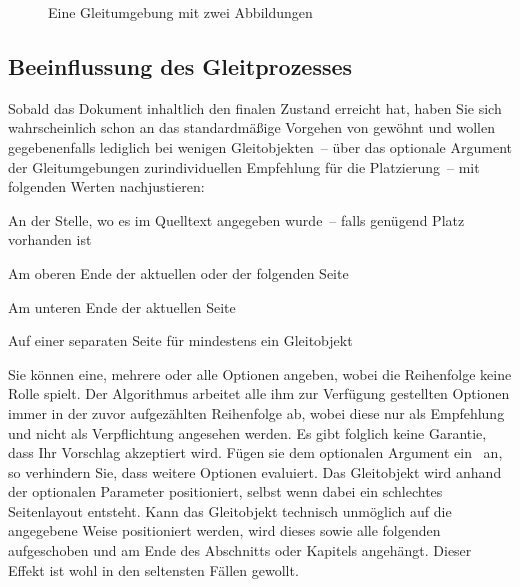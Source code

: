 \documentclass[%
  english,ngerman,%
  cdgeometry=no,DIV=12,%
  automark,%
  listof=toc,%
]{tudscrartcl}
\begin{document}
\begin{Trunk}
\begin{figure}
%
  {\caption{Eine Gleitumgebung mit zwei Abbildungen}\label{fig:logos}}%
\end{figure}

\end{Trunk}
\InputCode


\subsection{Beeinflussung des Gleitprozesses}
Sobald das Dokument inhaltlich den finalen Zustand erreicht hat, haben Sie sich 
wahrscheinlich schon an das standardmäßige Vorgehen von  gewöhnt 
und wollen gegebenenfalls lediglich bei wenigen Gleitobjekten~-- über das 
optionale Argument der Gleitumgebungen zurindividuellen Empfehlung für die 
Platzierung~-- mit folgenden Werten nachjustieren:
%
\begin{description}[labelindent=\parindent,leftmargin=*,style=nextline,itemsep=0pt]
\item[\POParameter{h} (here)]
  An der Stelle, wo es im Quelltext angegeben wurde~-- falls genügend Platz 
  vorhanden ist
\item[\POParameter{t} (top)]
  Am oberen Ende der aktuellen oder der folgenden Seite
\item[\POParameter{b} (bottom)]
  Am unteren Ende der aktuellen Seite
\item[\POParameter{p} (page)]
  Auf einer separaten Seite für mindestens ein Gleitobjekt
\end{description}
%
Sie können eine, mehrere oder alle Optionen angeben, wobei die Reihenfolge 
keine Rolle spielt. Der Algorithmus arbeitet alle ihm zur Verfügung gestellten 
Optionen immer in der zuvor aufgezählten Reihenfolge ab, wobei diese nur als 
Empfehlung und nicht als Verpflichtung angesehen werden. Es gibt folglich keine 
Garantie, dass Ihr Vorschlag akzeptiert wird. Fügen sie dem optionalen Argument 
ein~\PValue{!} an, so verhindern Sie, dass  weitere Optionen 
evaluiert. Das Gleitobjekt wird anhand der optionalen Parameter positioniert, 
selbst wenn dabei ein schlechtes Seitenlayout entsteht. Kann das Gleitobjekt 
technisch unmöglich auf die angegebene Weise positioniert werden, wird dieses 
sowie alle folgenden aufgeschoben und am Ende des Abschnitts oder Kapitels 
angehängt. Dieser Effekt ist wohl in den seltensten Fällen gewollt. 
\end{document}
